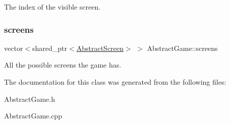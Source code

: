 The index of the visible screen. 

\mbox{\label{class_abstract_game_add5999d1c4190a9ad25dfdb51327720b}} 
\subsubsection{\texorpdfstring{screens}{screens}}
{\footnotesize\ttfamily vector$<$shared\+\_\+ptr$<$\mbox{\hyperlink{class_abstract_screen}{Abstract\+Screen}}$>$ $>$ Abstract\+Game\+::screens}



All the possible screens the game has. 



The documentation for this class was generated from the following files\+:\begin{DoxyCompactItemize}
\item 
Abstract\+Game.\+h\item 
Abstract\+Game.\+cpp\end{DoxyCompactItemize}
